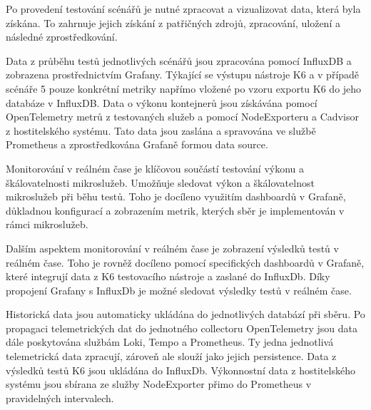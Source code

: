 
Po provedení testování scénářů je nutné zpracovat a vizualizovat data, která byla získána. To zahrnuje jejich získání z patřičných zdrojů, zpracování, uložení a následné zprostředkování.


Data z průběhu testů jednotlivých scénářů jsou zpracována pomocí InfluxDB a zobrazena prostřednictvím Grafany. Týkající se výstupu nástroje K6 a v případě scénáře 5 pouze konkrétní metriky napřímo vložené po vzoru exportu K6 do jeho databáze v InfluxDB. Data o výkonu kontejnerů jsou získávána pomocí OpenTelemetry metrů z testovaných služeb a pomocí NodeExporteru a Cadvisor z hostitelského systému. Tato data jsou zaslána a spravována ve službě Prometheus a zprostředkována Grafaně formou data source.


Monitorování v reálném čase je klíčovou součástí testování výkonu a škálovatelnosti mikroslužeb. Umožňuje sledovat výkon a škálovatelnost mikroslužeb při běhu testů. Toho je docíleno využitím dashboardů v Grafaně, důkladnou konfigurací a zobrazením metrik, kterých sběr je implementován v rámci mikroslužeb.

Dalším aspektem monitorování v reálném čase je zobrazení výsledků testů v reálném čase. Toho je rovněž docíleno pomocí specifických dashboardů v Grafaně, které integrují data z K6 testovacího nástroje a zaslané do InfluxDb. Díky propojení Grafany s InfluxDb je možné sledovat výsledky testů v reálném čase.


Historická data jsou automaticky ukládána do jednotlivých databází při sběru. Po propagaci telemetrických dat do jednotného collectoru OpenTelemetry jsou data dále poskytována službám Loki, Tempo a Prometheus. Ty jedna jednotlivá telemetrická data zpracují, zároveň ale slouží jako jejich persistence. Data z výsledků testů K6 jsou ukládána do InfluxDb. Výkonnostní data z hostitelského systému jsou sbírana ze služby NodeExporter přimo do Prometheus v pravidelných intervalech.
